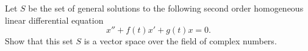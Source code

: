 \documentclass[12pt]{article} %
\newcommand{\vhat}{\boldsymbol{\hat{v}}}
\begin{document}

\begin{problem}
Let $S$ be the set of general solutions to the following second order homogeneous linear differential equation
\[
x''+f(t)x'+g(t)x=0.
\]
Show that this set $S$ is a vector space over the field of complex numbers.
\end{problem}
\end{document}
